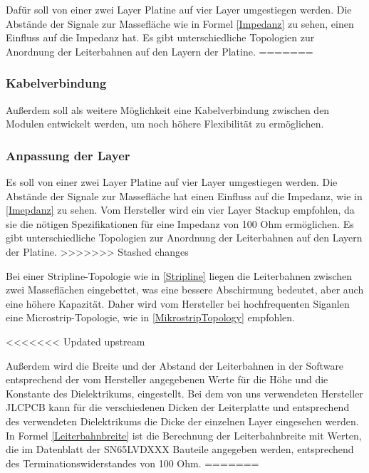 Dafür soll von einer zwei Layer Platine auf vier Layer umgestiegen werden. Die Abstände der Signale zur Massefläche wie in Formel \ref{Impedanz} zu sehen, einen Einfluss auf die Impedanz hat. Es gibt unterschiedliche Topologien zur Anordnung der Leiterbahnen auf den Layern der Platine.
=======
\subsubsection{Kabelverbindung}
Außerdem soll als weitere Möglichkeit eine Kabelverbindung zwischen den Modulen entwickelt werden, um noch höhere Flexibilität zu ermöglichen.

\subsubsection{Anpassung der Layer}
Es soll von einer zwei Layer Platine auf vier Layer umgestiegen werden. Die Abstände der Signale zur Massefläche hat einen Einfluss auf die Impedanz, wie in \ref{Imepdanz} zu sehen. Vom Hersteller wird ein vier Layer Stackup empfohlen, da sie die nötigen Spezifikationen für eine Impedanz von 100 Ohm ermöglichen. Es gibt unterschiedliche Topologien zur Anordnung der Leiterbahnen auf den Layern der Platine.
>>>>>>> Stashed changes

 
Bei einer Stripline-Topologie wie in \ref{Stripline} liegen die Leiterbahnen zwischen zwei Masseflächen eingebettet, was eine bessere Abschirmung bedeutet, aber auch eine höhere Kapazität. Daher wird vom Hersteller bei hochfrequenten Siganlen eine Microstrip-Topologie, wie in \ref{MikrostripTopology} empfohlen. 


<<<<<<< Updated upstream

Außerdem wird die Breite und der Abstand der Leiterbahnen in der Software entsprechend der vom Hersteller angegebenen Werte für die Höhe und die Konstante des Dielektrikums, eingestellt. Bei dem von uns verwendeten Hersteller JLCPCB kann für die verschiedenen Dicken der Leiterplatte und entsprechend des verwendeten Dielektrikums die Dicke der einzelnen Layer eingesehen werden.  
In Formel \ref{Leiterbahnbreite} ist die Berechnung der Leiterbahnbreite mit Werten, die im Datenblatt der SN65LVDXXX Bauteile angegeben werden, entsprechend des Terminationswiderstandes von 100 Ohm.
=======
